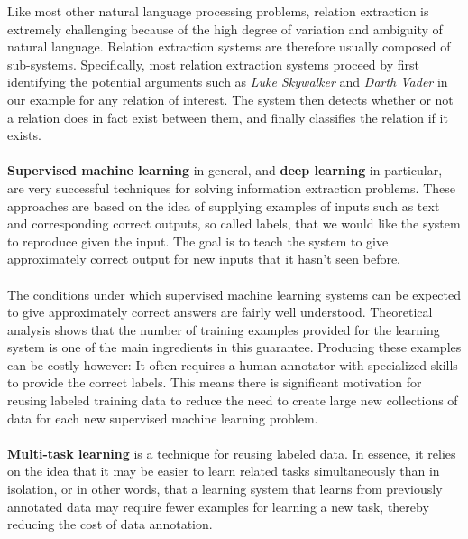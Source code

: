Like most other natural language processing problems, relation extraction is extremely challenging because of the high degree of variation and ambiguity of natural language. Relation extraction systems are therefore usually composed of sub-systems. Specifically, most relation extraction systems proceed by first identifying the potential arguments such as \textit{Luke Skywalker} and \textit{Darth Vader} in our example for any relation of interest. The system then detects whether or not a relation does in fact exist between them, and finally classifies the relation if it exists.
\\\\
\textbf{Supervised machine learning} in general, and \textbf{deep learning} in particular, are very successful techniques for solving information extraction problems. These approaches are based on the idea of supplying examples of inputs such as text and corresponding correct outputs, so called labels, that we would like the system to reproduce given the input. The goal is to teach the system to give approximately correct output for new inputs that it hasn't seen before.
\\\\
The conditions under which supervised machine learning systems can be expected to give approximately correct answers are fairly well understood. Theoretical analysis shows that the number of training examples provided for the learning system is one of the main ingredients in this guarantee. Producing these examples can be costly however: It often requires a human annotator with specialized skills to provide the correct labels. This means there is significant motivation for reusing labeled training data to reduce the need to create large new collections of data for each new supervised machine learning problem.
\\\\
\textbf{Multi-task learning} is a technique for reusing labeled data. In essence, it relies on the idea that it may be easier to learn related tasks simultaneously than in isolation, or in other words, that a learning system that learns from previously annotated data may require fewer examples for learning a new task, thereby reducing the cost of data annotation.